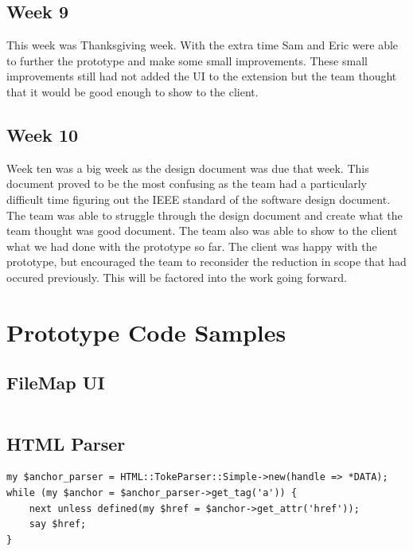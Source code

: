 \documentclass[letterpaper,10pt,titlepage,draftclsnofoot,onecolumn,onesided] {IEEEtran}
\begin{document}
	\subsection{Week 9}
	This week was Thanksgiving week. 
	With the extra time Sam and Eric were able to further the prototype and make some small improvements.
	These small improvements still had not added the UI to the extension but the team thought that it would be good enough to show to the client. 

	\subsection{Week 10}
	Week ten was a big week as the design document was due that week. 
	This document proved to be the most confusing as the team had a particularly difficult time figuring out the IEEE standard of the software design document. 
	The team was able to struggle through the design document and create what the team thought was good document. 
	The team also was able to show to the client what we had done with the prototype so far. 
	The client was happy with the prototype, but encouraged the team to reconsider the reduction in scope that had occured previously.
	This will be factored into the work going forward.
	
\section{Prototype Code Samples}
	
	\subsection{FileMap UI}
	\begin{lstlisting}

	\end{lstlisting}

	\subsection{HTML Parser}
	\begin{lstlisting}
my $anchor_parser = HTML::TokeParser::Simple->new(handle => *DATA);
while (my $anchor = $anchor_parser->get_tag('a')) {
    next unless defined(my $href = $anchor->get_attr('href'));
    say $href;
}
	\end{lstlisting}
	
\pagebreak
\end{document}
